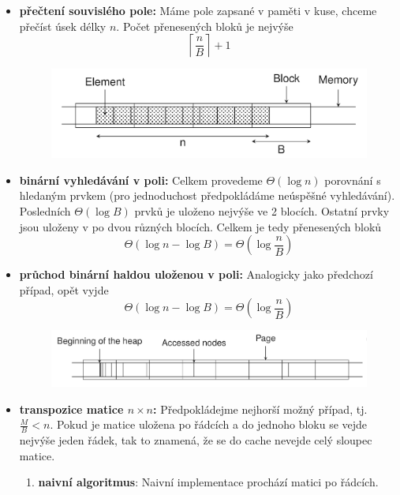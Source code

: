 \documentclass[11pt]{report} %
\numberwithin{equation}{section}
\begin{document}
\begin{itemize}
	\item \textbf{přečtení souvislého pole:} Máme pole zapsané v paměti v kuse, chceme přečíst úsek délky $n$. Počet přenesených bloků je nejvýše 
	$$\left\lceil \frac{n}{B}\right\rceil + 1$$
	
	\begin{figure}[H]
		\centering
		\includegraphics[scale=0.6]{img/cache_array.png}
	\end{figure}

	\item \textbf{binární vyhledávání v poli:} Celkem provedeme $\Theta(\log n)$ porovnání s hledaným prvkem (pro jednoduchost předpokládáme neúspěšné vyhledávání). Posledních $\Theta(\log B)$ prvků je uloženo nejvýše ve 2 blocích. Ostatní prvky jsou uloženy v po dvou různých blocích. Celkem je tedy přenesených bloků
	$$\Theta(\log n - \log B) = \Theta(\log \frac{n}{B})$$
	
	\item \textbf{průchod binární haldou uloženou v poli:} Analogicky jako předchozí případ, opět vyjde 
	$$\Theta(\log n - \log B) = \Theta(\log \frac{n}{B})$$
	\begin{figure}[H]
		\centering
		\includegraphics[scale=0.8]{img/cache_heap.png}
	\end{figure}
	
	\item \textbf{transpozice matice $n \times n$:} 
		Předpokládejme nejhorší možný případ, tj. $\frac{M}{B} < n$. Pokud je matice uložena po řádcích a do jednoho bloku se vejde nejvýše jeden řádek, tak to znamená, že se do cache nevejde celý sloupec matice. 
		\begin{enumerate}
			\item \textbf{naivní algoritmus}: 		
			Naivní implementace prochází matici po řádcích. 
			

\end{enumerate}
\end{itemize}
\end{document}
